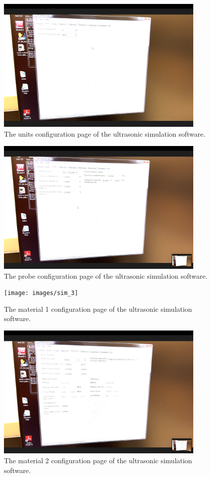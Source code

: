 \documentclass[12 pt]{report}
\begin{document}
\begin{figure}[htbp]
	\centering
	\includegraphics[width=4in]{images/sim_1}
	\caption{The units configuration page of the ultrasonic simulation software.}
	\label{fig:sim_1}
\end{figure}

\begin{figure}[htbp]
	\centering
	\includegraphics[width=4in]{images/sim_2}
	\caption{The probe configuration page of the ultrasonic simulation software.}
	\label{fig:sim_2}
\end{figure}

\begin{figure}[htbp]
	\centering
	\texttt{[image: images/sim\_3]}
	\caption{The material \num{1} configuration page of the ultrasonic simulation software.}
	\label{fig:sim_3}
\end{figure}

\begin{figure}[htbp]
	\centering
	\includegraphics[width=4in]{images/sim_4}
	\caption{The material \num{2} configuration page of the ultrasonic simulation software.}
	\label{fig:sim_4}
\end{figure}
\end{document}
